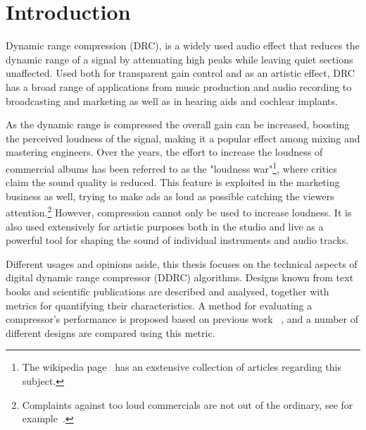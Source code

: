 \documentclass[../main2.tex]{subfiles}
\begin{document}
\section{Introduction}
Dynamic range compression (DRC), is a widely used audio effect that reduces the dynamic range of a signal by attenuating high peaks while leaving quiet sections unaffected. Used both for transparent gain control and as an artistic effect, DRC has a broad range of applications from music production and audio recording to broadcasting and marketing as well as in hearing aids and cochlear implants.

As the dynamic range is compressed the overall gain can be increased, boosting the perceived loudness of the signal, making it a popular effect among mixing and mastering engineers. Over the years, the effort to increase the loudness of commercial albums has been referred to as the "loudness war"\footnote{The wikipedia page~\cite{loudness_war} has an exstensive collection of articles regarding this subject.}, where critics claim the sound quality is reduced. This feature is exploited in the marketing business as well, trying to make ads as loud as possible catching the viewers attention.\footnote{Complaints against too loud commercials are not out of the ordinary, see for example~\cite{comp_ads}.} However, compression cannot only be used to increase loudness. It is also used extensively for artistic purposes both in the studio and live as a powerful tool for shaping the sound of individual instruments and audio tracks.

Different usages and opinions aside, this thesis focuses on the technical aspects of digital dynamic range compressor (DDRC) algorithms. Designs known from text books and scientific publications are described and analysed, together with metrics for quantifying their characteristics. A method for evaluating a compressor's performance is proposed based on previous work~\cite{stone1992syllabic}\cite{stone2007quantifying} \cite{reiss2012tutorial}, and a number of different designs are compared using this metric.

\end{document}

